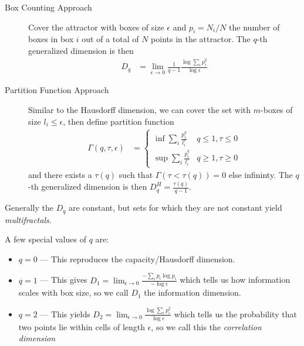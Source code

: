 \documentclass[12pt]{article}
\begin{document}
\begin{description}
    \item[Box Counting Approach] Cover the attractor with boxes of size
        $\epsilon$ and $p_i = N_i/N$ the number of boxes in box $i$ out of a
        total of $N$ points in the attractor. The $q$-th generalized dimension
        is then
        \begin{align}
            D_q &= \lim_{\epsilon \to 0}
            \frac{1}{q-1}\frac{\log \sum\limits_{i}^{}p_i^q}{\log \epsilon}
        \end{align}

    \item[Partition Function Approach] Similar to the Hausdorff dimension, we
        can cover the set with $m$-boxes of size $l_i \leq \epsilon$, then
        define partition function
        \begin{align}
            \Gamma(q,\tau,\epsilon) &=
            \begin{cases}
                \inf \sum\limits_{i}^{}\frac{p_i^q}{l_i^\tau} &
                    q \leq 1, \tau \leq 0 \\
                \sup \sum\limits_{i}^{} \frac{p_i^q}{l_i^\tau} &
                    q \geq 1, \tau \geq 0
            \end{cases}
        \end{align}
        and there exists a $\tau(q)$ such that $\Gamma(\tau < \tau(q)) = 0$ else
        infininty. The $q$-th generalized dimension is then
        $D_q^H = \frac{\tau(q)}{q-1}$.
\end{description}

Generally the $D_q$ are constant, but sets for which they are not constant yield
\emph{multifractals}.

A few special values of $q$ are:
\begin{itemize}
    \item $q=0$ --- This reproduces the capacity/Hausdorff dimension.
    \item $q=1$ --- This gives
        $D_1 = \lim_{\epsilon \to 0} \frac{-\sum\limits_{i}^{}p_i \log p_i}
        {-\log \epsilon}$
        which tells us how information scales with box size, so we call $D_1$
        the information dimension.
    \item $q=2$ --- This yields
        $D_2 = \lim_{\epsilon \to 0}
        \frac{\log \sum\limits_{i}^{}p_i^2}{\log \epsilon}$
        which tells us the probability that two points lie within cells of
        length $\epsilon$, so we call this the \emph{correlation dimension}
\end{itemize}
\end{document}
